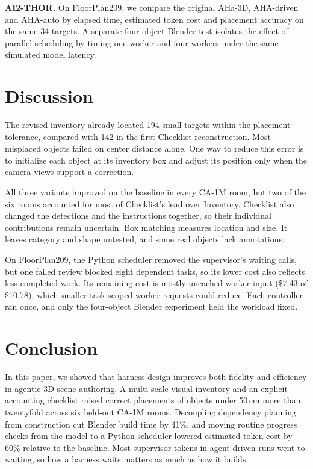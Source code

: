 \documentclass{article}
\begin{document}
\textbf{AI2-THOR.} On FloorPlan209, we compare the original AHa-3D,
AHA-driven and AHA-auto by elapsed time, estimated token cost and placement
accuracy on the same 34 targets. A separate four-object Blender test isolates
the effect of parallel scheduling by timing one worker and four workers
under the same simulated model latency.





\section{Discussion}
The revised inventory already located 194 small targets within the placement
tolerance, compared with 142 in the first Checklist reconstruction. Most
misplaced objects failed on center distance alone. One way to reduce this
error is to initialize each object at its inventory box and adjust its
position only when the camera views support a correction.

All three variants improved on the baseline in every CA-1M room, but two of
the six rooms accounted for most of Checklist's lead over Inventory. Checklist
also changed the detections and the instructions together, so their individual
contributions remain uncertain. Box matching measures location and size.
It leaves category and shape untested, and some real objects lack annotations.

On FloorPlan209, the Python scheduler removed the supervisor's waiting calls,
but one failed review blocked eight dependent tasks, so its lower cost also
reflects less completed work. Its remaining cost is mostly uncached worker
input (\$7.43 of \$10.78), which smaller task-scoped worker requests could
reduce. Each controller ran once, and only the four-object Blender experiment
held the workload fixed.

\section{Conclusion}
In this paper, we showed that harness design improves both fidelity and efficiency in agentic 3D scene authoring. A multi-scale visual inventory and an explicit accounting checklist raised correct placements of objects under 50\,cm more than twentyfold across six held-out CA-1M rooms. Decoupling dependency planning from construction cut Blender build time by 41\%, and moving routine progress checks from the model to a Python scheduler lowered estimated token cost by 60\% relative to the baseline. Most supervisor tokens in agent-driven runs went to waiting, so how a harness waits matters as much as how it builds.
\label{main-text-end}
\clearpage


\clearpage
\appendix

\clearpage


\clearpage

\end{document}
